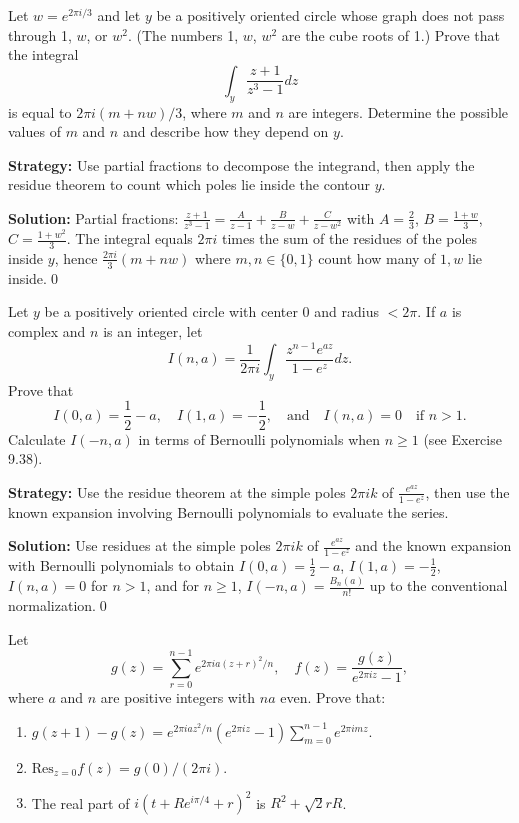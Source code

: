 \begin{problembox}
Let \( w = e^{2\pi i / 3} \) and let \( y \) be a positively oriented circle whose graph does not pass through 1, \( w \), or \( w^2 \). (The numbers 1, \( w \), \( w^2 \) are the cube roots of 1.) Prove that the integral
\[ \int_y \frac{z + 1}{z^3 - 1} dz \]
is equal to \( 2\pi i (m + n w) / 3 \), where \( m \) and \( n \) are integers. Determine the possible values of \( m \) and \( n \) and describe how they depend on \( y \).
\end{problembox}

\noindent\textbf{Strategy:} Use partial fractions to decompose the integrand, then apply the residue theorem to count which poles lie inside the contour \( y \).

\bigskip\noindent\textbf{Solution:}
Partial fractions: $\frac{z+1}{z^3-1}=\frac{A}{z-1}+\frac{B}{z-w}+\frac{C}{z-w^2}$ with $A=\tfrac{2}{3}$, $B=\tfrac{1+w}{3}$, $C=\tfrac{1+w^2}{3}$. The integral equals $2\pi i$ times the sum of the residues of the poles inside $y$, hence $\frac{2\pi i}{3}(m+n w)$ where $m,n\in\{0,1\}$ count how many of $1,w$ lie inside.\qed


\begin{problembox}
Let \( y \) be a positively oriented circle with center 0 and radius \( < 2\pi \). If \( a \) is complex and \( n \) is an integer, let
\[ I(n, a) = \frac{1}{2\pi i} \int_y \frac{z^{n-1} e^{az}}{1 - e^z} dz. \]
Prove that
\[ I(0, a) = \frac{1}{2} - a, \quad I(1, a) = -\frac{1}{2}, \quad \text{and} \quad I(n, a) = 0 \quad \text{if } n > 1. \]
Calculate \( I(-n, a) \) in terms of Bernoulli polynomials when \( n \geq 1 \) (see Exercise 9.38).
\end{problembox}

\noindent\textbf{Strategy:} Use the residue theorem at the simple poles \( 2\pi i k \) of \( \frac{e^{az}}{1-e^z} \), then use the known expansion involving Bernoulli polynomials to evaluate the series.

\bigskip\noindent\textbf{Solution:}
Use residues at the simple poles $2\pi i k$ of $\frac{e^{az}}{1-e^z}$ and the known expansion with Bernoulli polynomials to obtain $I(0,a)=\tfrac12-a$, $I(1,a)=-\tfrac12$, $I(n,a)=0$ for $n>1$, and for $n\ge1$, $I(-n,a)=\tfrac{B_n(a)}{n!}$ up to the conventional normalization.\qed


\begin{problembox}
Let
\[ g(z) = \sum_{r=0}^{n-1} e^{2\pi i a (z + r)^2 / n}, \quad f(z) = \frac{g(z)}{e^{2\pi i z} - 1}, \]
where \( a \) and \( n \) are positive integers with \( na \) even. Prove that:
\begin{enumerate}[label=(\alph*)]
\item \( g(z + 1) - g(z) = e^{2\pi i a z^2 / n} (e^{2\pi i z} - 1) \sum_{m=0}^{n-1} e^{2\pi i m z}. \)
\item \( \text{Res}_{z=0} f(z) = g(0) / (2\pi i). \)
\item The real part of \( i (t + R e^{i\pi / 4} + r)^2 \) is \( R^2 + \sqrt{2} r R \).
\end{enumerate}
\end{problembox}

